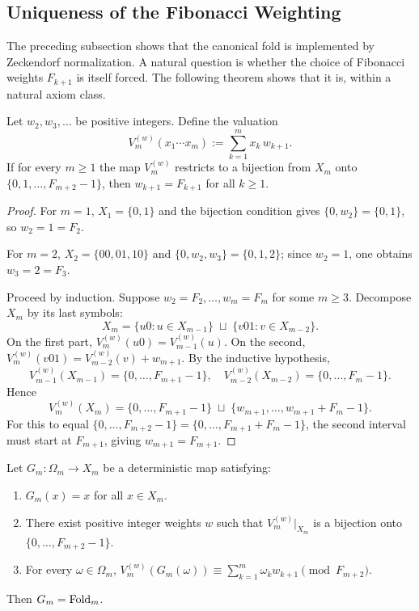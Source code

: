 \subsection{Uniqueness of the Fibonacci Weighting}

The preceding subsection shows that the canonical fold is implemented by
Zeckendorf normalization. A natural question is whether the choice of
Fibonacci weights \(F_{k+1}\) is itself forced. The following theorem shows
that it is, within a natural axiom class.

\begin{theorem}
\label{thm:fibonacci-weight-uniqueness}
Let \(w_2,w_3,\dots\) be positive integers. Define the valuation
\[
V_m^{(w)}(x_1\cdots x_m):=\sum_{k=1}^m x_k\,w_{k+1}.
\]
If for every \(m\ge 1\) the map \(V_m^{(w)}\) restricts to a bijection from
\(X_m\) onto \(\{0,1,\dots,F_{m+2}-1\}\), then \(w_{k+1}=F_{k+1}\) for all
\(k\ge 1\).
\end{theorem}

\begin{proof}
For \(m=1\), \(X_1=\{0,1\}\) and the bijection condition gives
\(\{0,w_2\}=\{0,1\}\), so \(w_2=1=F_2\).

For \(m=2\), \(X_2=\{00,01,10\}\) and \(\{0,w_2,w_3\}=\{0,1,2\}\); since
\(w_2=1\), one obtains \(w_3=2=F_3\).

Proceed by induction. Suppose \(w_2=F_2,\dots,w_m=F_m\) for some
\(m\ge 3\). Decompose \(X_m\) by its last symbols:
\[
X_m
=
\{u0: u\in X_{m-1}\}
\;\sqcup\;
\{v01: v\in X_{m-2}\}.
\]
On the first part, \(V_m^{(w)}(u0)=V_{m-1}^{(w)}(u)\). On the second,
\(V_m^{(w)}(v01)=V_{m-2}^{(w)}(v)+w_{m+1}\). By the inductive hypothesis,
\[
V_{m-1}^{(w)}(X_{m-1})=\{0,\dots,F_{m+1}-1\},
\quad
V_{m-2}^{(w)}(X_{m-2})=\{0,\dots,F_m-1\}.
\]
Hence
\[
V_m^{(w)}(X_m)
=
\{0,\dots,F_{m+1}-1\}
\;\sqcup\;
\{w_{m+1},\dots,w_{m+1}+F_m-1\}.
\]
For this to equal \(\{0,\dots,F_{m+2}-1\}=\{0,\dots,F_{m+1}+F_m-1\}\), the
second interval must start at \(F_{m+1}\), giving \(w_{m+1}=F_{m+1}\).
\end{proof}

\begin{corollary}
\label{cor:canonical-fold-uniqueness}
Let \(G_m:\Omega_m\to X_m\) be a deterministic map satisfying:
\begin{enumerate}
\item \(G_m(x)=x\) for all \(x\in X_m\).
\item There exist positive integer weights \(w\) such that
  \(V_m^{(w)}|_{X_m}\) is a bijection onto \(\{0,\dots,F_{m+2}-1\}\).
\item For every \(\omega\in\Omega_m\),
  \(V_m^{(w)}(G_m(\omega))\equiv \sum_{k=1}^m\omega_k w_{k+1}
  \pmod{F_{m+2}}\).
\end{enumerate}
Then \(G_m=\mathrm{Fold}_m\).
\end{corollary}

